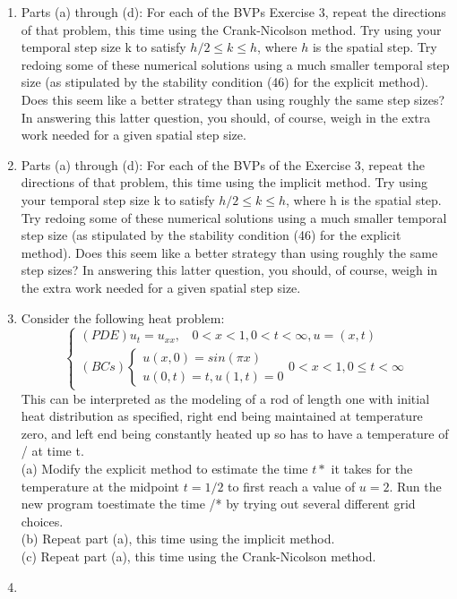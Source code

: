 \documentclass[../main.tex]{subfiles}
\begin{document}
\begin{enumerate}
	\item
		Parts (a) through (d): For each of the BVPs Exercise 3, repeat the directions of that problem, this time using the Crank-Nicolson method. Try using your temporal step size k to satisfy $h/2\leqslant k\leqslant h$, where $h$ is the spatial step. Try redoing some of these numerical solutions using a much smaller temporal step size (as stipulated by the stability condition (46) for the explicit method). Does this seem like a better strategy than using roughly the same step sizes? In answering this latter question, you should, of course, weigh in the extra work needed for a given spatial step size. 
		\item
			Parts (a) through (d): For each of the BVPs of the Exercise 3, repeat the directions of that problem, this time using the implicit method. Try using your temporal step size k to satisfy $h/2 \leqslant k \leqslant h$, where h is the spatial step. Try redoing some of these numerical solutions using a much smaller temporal step size (as stipulated by the stability condition (46) for the explicit method). Does this seem like a better strategy than using roughly the same step sizes? In answering this latter question, you should, of course, weigh in the extra work needed for a given spatial step size. 
			\item
			Consider the following heat problem:
$$\begin{cases} 
	(PDE) u_t=u_{xx},
	~~~~0<x<1, 0<t<\infty,u=(x,t)\\
(BCs)
		\begin{cases}
		u(x,0)=sin(\pi x)\\
		u(0,t)=t, u(1,t)=0
		\end{cases}
		0 < x < 1, 0 \leqslant t < \infty 
	\end{cases}$$
This can be interpreted as the modeling of a rod of length one with initial heat distribution as specified, right end being maintained at temperature zero, and left end being constantly heated up so has to have a temperature of / at time t. 
\\
(a) Modify the explicit method to estimate the time $t*$ it takes for the temperature at the midpoint $t = 1/2$ to first reach a value of $u = 2$. Run the new program toestimate the time /* by 
trying out several different grid choices. 
\\
(b) Repeat part (a), this time using the implicit method. 
\\
(c) Repeat part (a), this time using the Crank-Nicolson method.
	\item 

\end{enumerate}
\end{document}
